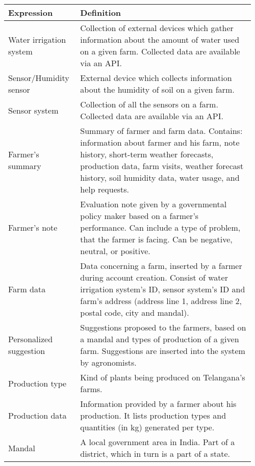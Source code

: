\begin{center}
\begin{longtable}{@{}p{0.28\linewidth} p{0.68\linewidth}@{}}
		\toprule
		\textbf{Expression}     & \textbf{Definition}\\
		\midrule
		Water irrigation system & Collection of external devices which gather information about the amount of water used on a given farm. Collected data are available via an API. \\
        Sensor/Humidity sensor & External device which collects information about the humidity of soil on a given farm.\\
        Sensor system           & Collection of all the sensors on a farm. Collected data are available via an API.\\
        Farmer's summary        & Summary of farmer and farm data. Contains: information about farmer and his farm, note history, short-term weather forecasts, production data, farm visits, weather forecast history, soil humidity data, water usage, and help requests.\\
        Farmer's note           & Evaluation note given by a governmental policy maker based on a farmer's performance. Can include a type of problem, that the farmer is facing. Can be negative, neutral, or positive.\\
        Farm data               & Data concerning a farm, inserted by a farmer during account creation. Consist of water irrigation system’s ID, sensor system’s ID and farm's address (address line 1, address line 2, postal code, city and mandal).\\
        Personalized suggestion & Suggestions proposed to the farmers, based on a mandal and types of production of a given farm. Suggestions are inserted into the system by agronomists.\\
        Production type         & Kind of plants being produced on Telangana's farms.\\
        Production data         & Information provided by a farmer about his production. It lists production types and quantities (in kg) generated per type.\\
        Mandal                  & A local government area in India. Part of a district, which in turn is a part of a state.\\

\end{longtable}
\end{center}
